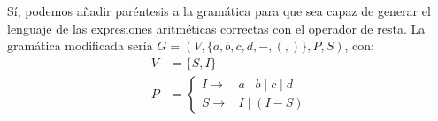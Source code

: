 \begin{ejercicio}
\begin{enumerate}
        Sí, podemos añadir paréntesis a la gramática para que sea capaz de generar el lenguaje de las expresiones aritméticas correctas con el operador de resta. La gramática modificada sería $G=(V,\{a,b,c,d,-,(,)\},P,S)$, con:
        \begin{equation*}
            \begin{aligned}
                V &= \{ S, I \} \\
                P &= \left\{
                    \begin{aligned}
                        I\rightarrow &a \mid b \mid c \mid d \\
                        S\rightarrow &I \mid (I-S)
                    \end{aligned}
                \right.
            \end{aligned}
        \end{equation*}
    \end{enumerate}
\end{ejercicio}

